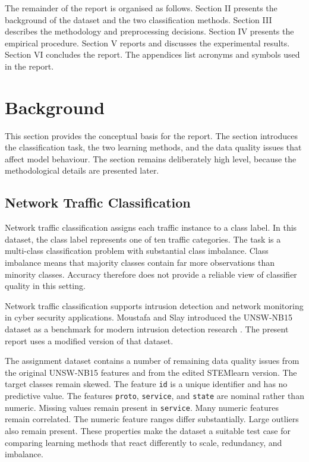 \documentclass[conference,10pt]{IEEEtran}
\begin{document}
The remainder of the report is organised as follows. Section II presents the background of the dataset and the two classification methods. Section III describes the methodology and preprocessing decisions. Section IV presents the empirical procedure. Section V reports and discusses the experimental results. Section VI concludes the report. The appendices list acronyms and symbols used in the report.

\section{Background}
This section provides the conceptual basis for the report. The section introduces the classification task, the two learning methods, and the data quality issues that affect model behaviour. The section remains deliberately high level, because the methodological details are presented later.

\subsection{Network Traffic Classification}
Network traffic classification assigns each traffic instance to a class label. In this dataset, the class label represents one of ten traffic categories. The task is a multi-class classification problem with substantial class imbalance. Class imbalance means that majority classes contain far more observations than minority classes. Accuracy therefore does not provide a reliable view of classifier quality in this setting.

Network traffic classification supports intrusion detection and network monitoring in cyber security applications. Moustafa and Slay introduced the UNSW-NB15 dataset as a benchmark for modern intrusion detection research \cite{unsw}. The present report uses a modified version of that dataset.

The assignment dataset contains a number of remaining data quality issues from the original UNSW-NB15 features and from the edited STEMlearn version. The target classes remain skewed. The feature \texttt{id} is a unique identifier and has no predictive value. The features \texttt{proto}, \texttt{service}, and \texttt{state} are nominal rather than numeric. Missing values remain present in \texttt{service}. Many numeric features remain correlated. The numeric feature ranges differ substantially. Large outliers also remain present. These properties make the dataset a suitable test case for comparing learning methods that react differently to scale, redundancy, and imbalance.
\end{document}
